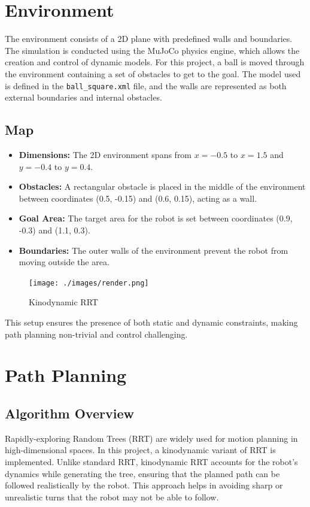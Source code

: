 \documentclass[12pt]{article}
\begin{document}
\section{Environment}
The environment consists of a 2D plane with predefined walls and boundaries. The simulation is conducted using the MuJoCo physics engine, which allows the creation and control of dynamic models. For this project, a ball is moved through the environment containing a set of obstacles to get to the goal. The model used is defined in the \texttt{ball\_square.xml} file, and the walls are represented as both external boundaries and internal obstacles.

\subsection{Map}
\begin{itemize}
    \item \textbf{Dimensions:} The 2D environment spans from $x = -0.5$ to $x = 1.5$ and $y = -0.4$ to $y = 0.4$.
    \item \textbf{Obstacles:} A rectangular obstacle is placed in the middle of the environment between coordinates (0.5, -0.15) and (0.6, 0.15), acting as a wall.
    \item \textbf{Goal Area:} The target area for the robot is set between coordinates (0.9, -0.3) and (1.1, 0.3).
    \item \textbf{Boundaries:} The outer walls of the environment prevent the robot from moving outside the area.
\end{itemize}

    \begin{figure}[h]
    \centering
      \texttt{[image: ./images/render.png]}
      \caption{Kinodynamic RRT}
      \label{fig:sample_image}
    \end{figure}

This setup ensures the presence of both static and dynamic constraints, making path planning non-trivial and control challenging.

\section{Path Planning}

\subsection{Algorithm Overview}
Rapidly-exploring Random Trees (RRT) are widely used for motion planning in high-dimensional spaces. In this project, a kinodynamic variant of RRT is implemented. Unlike standard RRT, kinodynamic RRT accounts for the robot’s dynamics while generating the tree, ensuring that the planned path can be followed realistically by the robot. This approach helps in avoiding sharp or unrealistic turns that the robot may not be able to follow.
\end{document}
